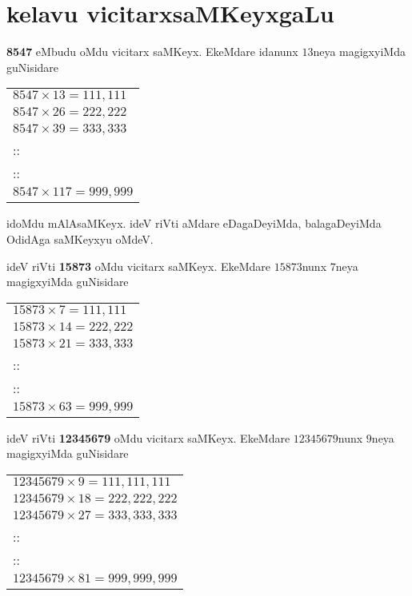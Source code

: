 \chapter{kelavu vicitarxsaMKeyxgaLu}\label{chap11}

\begin{multicols}{2}
\noindent
{\rm\bfseries 8547} eMbudu oMdu vicitarx saMKeyx. EkeMdare idanunx $13$neya magigxyiMda guNi\-sidare
\begin{center}
\begin{tabular}{l}
$8547\times 13=111,111$\\[2pt]
$8547\times 26=222,222$\\[2pt]
$8547\times 39=333,333$\\[2pt]
::\\
::\\
{\small $8547\times 117=999,999$}
\end{tabular}
\end{center}

idoMdu mAlAsaMKeyx. ideV riVti aMdare eDagaDeyiMda, balagaDe\-yiMda OdidAga saMKeyxyu oMdeV.

ideV riVti {\rm\bfseries 15873} oMdu \hbox{vicitarx} saMKeyx. EkeMdare $15873$nunx $7$neya magigxyiMda guNisidare
\begin{center}
\begin{tabular}{l}
$15873\times 7=111,111$\\[2pt]
$15873\times 14=222,222$\\[2pt]
$15873\times 21=333,333$\\[2pt]
::\\
::\\
{\small $15873\times 63=999,999$}
\end{tabular}
\end{center}

ideV riVti {\rm\bfseries 12345679} oMdu \hbox{vicitarx} saMKeyx. EkeMdare $12345679$nunx $9$neya magigxyiMda guNisidare
\begin{center}
\begin{tabular}{l}
$12345679\times 9=111,111,111$\\[2pt]
$12345679\times 18=222,222,222$\\[2pt]
$12345679\times 27=333,333,333$\\[2pt]
::\\
::\\
{\small $12345679\times 81=999,999,999$}
\end{tabular}
\end{center}


\end{multicols}
